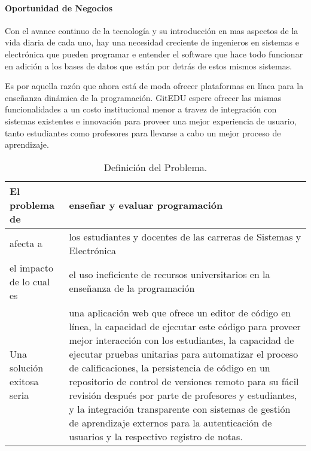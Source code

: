 \paragraph{Oportunidad de Negocios}
Con el avance continuo de la tecnología y su introducción en mas aspectos de la vida diaria de cada uno, hay una necesidad creciente de ingenieros en sistemas e electrónica que pueden programar e entender el software que hace todo funcionar en adición a los bases de datos que están por detrás de estos mismos sistemas.
 
Es por aquella razón que ahora está de moda ofrecer plataformas en línea para la enseñanza dinámica de la programación. GitEDU espere ofrecer las mismas funcionalidades a un costo institucional menor a travez de integración con sistemas existentes e innovación para proveer una mejor experiencia de usuario, tanto estudiantes como profesores para llevarse a cabo un mejor proceso de aprendizaje.

\begin{table}[h!]
  \begin{tabular}{|p{}|p{}|}
    \hline
    El problema de & enseñar y evaluar programación \\
    \hline
    afecta a & los estudiantes y docentes de las carreras de Sistemas y Electrónica \\
    \hline
    el impacto de lo cual es & el uso ineficiente de recursos universitarios en la enseñanza de la programación \\
    \hline
    Una solución exitosa seria & una aplicación web que ofrece un editor de código en línea, la capacidad de ejecutar este código para proveer mejor interacción con los estudiantes, la capacidad de ejecutar pruebas unitarias para automatizar el proceso de calificaciones, la persistencia de código en un repositorio de control de versiones remoto para su fácil revisión después por parte de profesores y estudiantes, y la integración transparente con sistemas de gestión de aprendizaje externos para la autenticación de usuarios y la respectivo registro de notas. \\
    \hline
  \end{tabular}
  \caption{Definición del Problema.}
  \label{def-prob}
\end{table}


